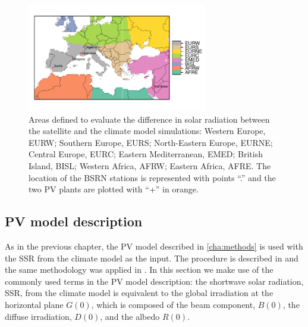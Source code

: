 \begin{figure}[h!]
\centering\includegraphics[width=0.7\textwidth]{figs/capitulo6/zonasPuntosLabel.pdf}
\caption[Euro-Mediterranean areas defined and local points]{Areas defined to evaluate the difference in solar radiation between the satellite and the climate model simulations: Western Europe, EURW; Southern Europe, EURS; North-Eastern Europe, EURNE; Central Europe, EURC; Eastern Mediterranean, EMED; British Island, BISL; Western Africa, AFRW; Eastern Africa, AFRE. The location of the BSRN stations is represented with points ``.'' and the two PV plants are plotted with ``+'' in orange.}
\label{fig:mapapral}
\end{figure}

 
\subsection{PV model description}

As in the previous chapter, the PV model described in \ref{cha:methods} is used with the SSR from the climate model as the input. The procedure is described in \cite{Perpinan2009} and the same methodology was applied in \cite{Gutierrez2017}. In this section we make use of the commonly used terms in the PV model description: the shortwave solar radiation, SSR, from the climate model is equivalent to the global irradiation at the horizontal plane $G(0)$, which is composed of the beam component, $B(0)$, the diffuse irradiation, $D(0)$, and the albedo $R(0)$.


